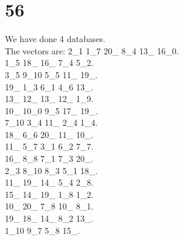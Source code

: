 \chapter{56}
\indent We have done 4 databases.\\
The vectors are:
2\_1 1\_7 20\_ 8\_4 13\_ 16\_0.\\1\_5 18\_ 16\_ 7\_4 5\_2.\\3\_5 9\_10 5\_5 11\_ 19\_.\\19\_ 1\_3 6\_1 4\_6 13\_.\\13\_ 12\_ 13\_ 12\_ 1\_9.\\10\_ 10\_0 9\_5 17\_ 19\_.\\7\_10 3\_4 11\_ 2\_4 1\_4.\\18\_ 6\_6 20\_ 11\_ 10\_.\\11\_ 5\_7 3\_1 6\_2 7\_7.\\16\_ 8\_8 7\_1 7\_3 20\_.\\2\_3 8\_10 8\_3 5\_1 18\_.\\11\_ 19\_ 14\_ 5\_4 2\_8.\\15\_ 14\_ 19\_ 1\_8 1\_2.\\10\_ 20\_ 7\_8 10\_ 8\_1.\\19\_ 18\_ 14\_ 8\_2 13\_.\\1\_10 9\_7 5\_8 15\_.\\